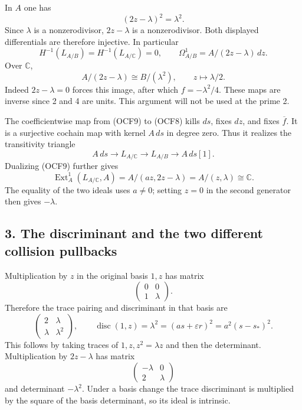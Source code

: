 \documentclass[
]{article}
\begin{document}
In \(A\) one has \[
(2z-\lambda)^2=\lambda^2.
\tag{OCF10}
\] Since \(\lambda\) is a nonzerodivisor, \(2z-\lambda\) is a
nonzerodivisor. Both displayed differentials are therefore injective. In
particular \[
H^{-1}(L_{A/B})=H^{-1}(L_{A/\mathbb C})=0,
\qquad
\Omega^1_{A/B}=A/(2z-\lambda)\,dz.
\tag{OCF11}
\] Over \(\mathbb C\), \[
A/(2z-\lambda)\cong B/(\lambda^2),\qquad z\mapsto\lambda/2.
\tag{OCF12}
\] Indeed \(2z-\lambda=0\) forces this image, after which
\(f=-\lambda^2/4\). These maps are inverse since 2 and 4 are units. This
argument will not be used at the prime 2.

The coefficientwise map from (OCF9) to (OCF8) kills \(ds\), fixes
\(dz\), and fixes \(\overline f\). It is a surjective cochain map with
kernel \(A\,ds\) in degree zero. Thus it realizes the transitivity
triangle \[
A\,ds\longrightarrow L_{A/\mathbb C}
\longrightarrow L_{A/B}\longrightarrow A\,ds[1].
\tag{OCF13}
\] Dualizing (OCF9) further gives \[
\operatorname{Ext}^1_A(L_{A/\mathbb C},A)
=A/(az,2z-\lambda)=A/(z,\lambda)\cong\mathbb C.
\tag{OCF14}
\] The equality of the two ideals uses \(a\ne0\); setting \(z=0\) in the
second generator then gives \(-\lambda\).

\subsection{3. The discriminant and the two different collision
pullbacks}\label{the-discriminant-and-the-two-different-collision-pullbacks}

Multiplication by \(z\) in the original basis \(1,z\) has matrix \[
\begin{pmatrix}0&0\\1&\lambda\end{pmatrix}.
\] Therefore the trace pairing and discriminant in that basis are \[
\begin{pmatrix}2&\lambda\\\lambda&\lambda^2\end{pmatrix},
\qquad
\operatorname{disc}(1,z)=\lambda^2
=(as+\varepsilon r)^2=a^2(s-s_*)^2.
\tag{OCF15}
\] This follows by taking traces of \(1,z,z^2=\lambda z\) and then the
determinant. Multiplication by \(2z-\lambda\) has matrix \[
\begin{pmatrix}-\lambda&0\\2&\lambda\end{pmatrix}
\] and determinant \(-\lambda^2\). Under a basis change the trace
discriminant is multiplied by the square of the basis determinant, so
its ideal is intrinsic.
\end{document}
